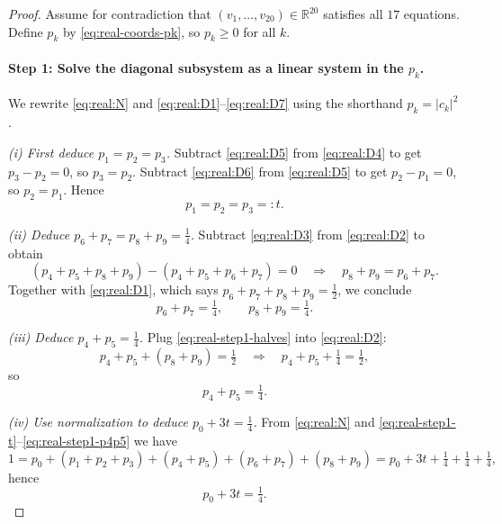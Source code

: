 \documentclass[11pt]{article}
\begin{document}
\begin{proof}
Assume for contradiction that $(v_1,\dots,v_{20})\in\mathbb R^{20}$ satisfies all $17$ equations.
Define $p_k$ by \eqref{eq:real-coords-pk}, so $p_k\ge 0$ for all $k$.

\paragraph{Step 1: Solve the diagonal subsystem as a linear system in the $p_k$.}
We rewrite \eqref{eq:real:N} and \eqref{eq:real:D1}--\eqref{eq:real:D7} using the shorthand $p_k=|c_k|^2$.

\smallskip
\noindent\emph{(i) First deduce $p_1=p_2=p_3$.}
Subtract \eqref{eq:real:D5} from \eqref{eq:real:D4} to get $p_3-p_2=0$, so $p_3=p_2$.
Subtract \eqref{eq:real:D6} from \eqref{eq:real:D5} to get $p_2-p_1=0$, so $p_2=p_1$.
Hence
\begin{equation}
p_1=p_2=p_3=:t.
\label{eq:real-step1-t}
\end{equation}

\smallskip
\noindent\emph{(ii) Deduce $p_6+p_7=p_8+p_9=\tfrac14$.}
Subtract \eqref{eq:real:D3} from \eqref{eq:real:D2} to obtain
\[
(p_4+p_5+p_8+p_9)-(p_4+p_5+p_6+p_7)=0
\quad\Longrightarrow\quad
p_8+p_9=p_6+p_7.
\]
Together with \eqref{eq:real:D1}, which says $p_6+p_7+p_8+p_9=\tfrac12$, we conclude
\begin{equation}
p_6+p_7=\tfrac14,
\qquad
p_8+p_9=\tfrac14.
\label{eq:real-step1-halves}
\end{equation}

\smallskip
\noindent\emph{(iii) Deduce $p_4+p_5=\tfrac14$.}
Plug \eqref{eq:real-step1-halves} into \eqref{eq:real:D2}:
\[
p_4+p_5+(p_8+p_9)=\tfrac12
\quad\Longrightarrow\quad
p_4+p_5+\tfrac14=\tfrac12,
\]
so
\begin{equation}
p_4+p_5=\tfrac14.
\label{eq:real-step1-p4p5}
\end{equation}

\smallskip
\noindent\emph{(iv) Use normalization to deduce $p_0+3t=\tfrac14$.}
From \eqref{eq:real:N} and \eqref{eq:real-step1-t}--\eqref{eq:real-step1-p4p5} we have
\[
1
=p_0+(p_1+p_2+p_3)+(p_4+p_5)+(p_6+p_7)+(p_8+p_9)
=p_0+3t+\tfrac14+\tfrac14+\tfrac14,
\]
hence
\begin{equation}
p_0+3t=\tfrac14.
\label{eq:real-step1-p0t}
\end{equation}


\end{proof}
\end{document}
